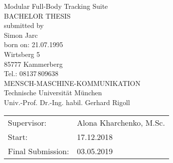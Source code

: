 \documentclass[a4paper,twoside, openright,12pt]{report}
\begin{document}
\pagestyle{empty}
\enlargethispage{4.5cm} %
\begin{center}
\phantom{u}
\vspace{0.5cm}
\Huge{\sc Modular Full-Body Tracking Suite}\\
\vspace{1.5cm}
		\large{
			BACHELOR THESIS\\%
			\vspace{0.4cm}
			submitted by\\
			Simon Jarc\\
			\vspace{0.5cm}
			born on: 21.07.1995\\
			\vspace{0.5cm}
			Wirtsberg 5 \\
			85777 Kammerberg \\
			Tel.: 08137\,809638 \\
			\vspace{1.5cm}
			MENSCH-MASCHINE-KOMMUNIKATION\\
			Technische Universit\"at M\"unchen\\
			\vspace{0.3cm}
			Univ.-Prof. Dr.-Ing. habil. Gerhard Rigoll\\
		}
\end{center}
\vspace{5.5cm}
\begin{tabular}{ll}
Supervisor: & Alona Kharchenko, M.Sc.  \\
Start: & 17.12.2018  \\
Final Submission: &  03.05.2019 \\
\end{tabular}

\newpage


\phantom{u}
\phantom{1}\vspace{6cm}
\end{document}
